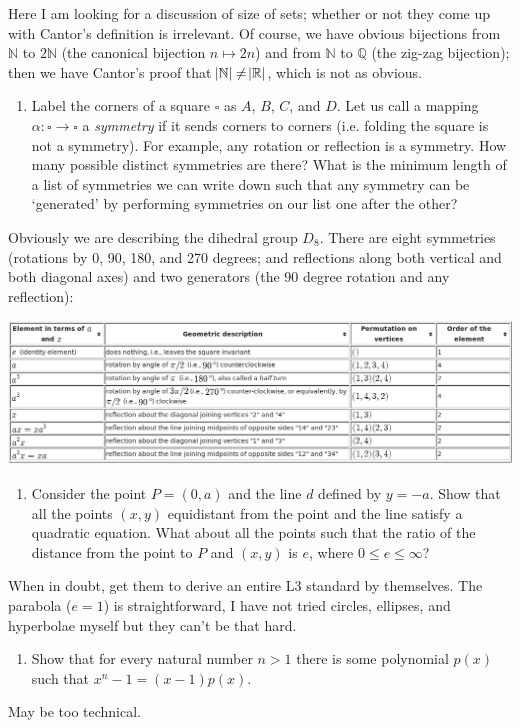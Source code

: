 \documentclass{amsart}
\begin{document}
Here I am looking for a discussion of size of sets; whether or not they come up with Cantor's definition is irrelevant. Of course, we have obvious
bijections from $ \mathbb{N} $ to $ 2\mathbb{N} $ (the canonical bijection $ n \mapsto 2n $) and from $ \mathbb{N} $ to $ \mathbb{Q} $ (the zig-zag
bijection); then we have Cantor's proof that $ \abs{\mathbb{N}} \neq \abs{\mathbb{R}} $, which is not as obvious.

\filbreak\begin{enumerate}[resume]\bfseries
  \item Label the corners of a square $ \square $ as $ A $, $ B $, $ C $, and $ D $. Let us call a mapping $ \alpha : \square \to \square $ a \emph{symmetry}
        if it sends corners to corners (i.e. folding the square is not a symmetry). For example, any rotation or reflection is a symmetry. How many possible
        distinct symmetries are there? What is the minimum length of a list of symmetries we can write down such that any symmetry can be `generated' by performing
        symmetries on our list one after the other?
\end{enumerate}

Obviously we are describing the dihedral group $ D_8 $. There are eight symmetries (rotations by 0, 90, 180, and 270 degrees; and reflections
along both vertical and both diagonal axes) and two generators (the 90 degree rotation and any reflection):
\begin{center}
  \includegraphics[width=\textwidth]{symmetriesofsquare}
\end{center}

\filbreak\begin{enumerate}[resume]\bfseries
  \item Consider the point $ P = (0, a) $ and the line $ d $ defined by $ y = -a $. Show that all the points $ (x, y) $ equidistant from the point and the
        line satisfy a quadratic equation. What about all the points such that the ratio of the distance from the point to $ P $ and $ (x,y) $ is $ e $,
        where $ 0 \leq e \leq \infty $?
\end{enumerate}

When in doubt, get them to derive an entire L3 standard by themselves. The parabola ($ e = 1 $) is straightforward, I have not tried circles, ellipses, and
hyperbolae myself but they can't be that hard.

\filbreak\begin{enumerate}[resume]\bfseries
  \item Show that for every natural number $ n > 1 $ there is some polynomial $ p(x) $ such that $ x^n - 1 = (x - 1)p(x) $.
\end{enumerate}
May be too technical.
\end{document}
